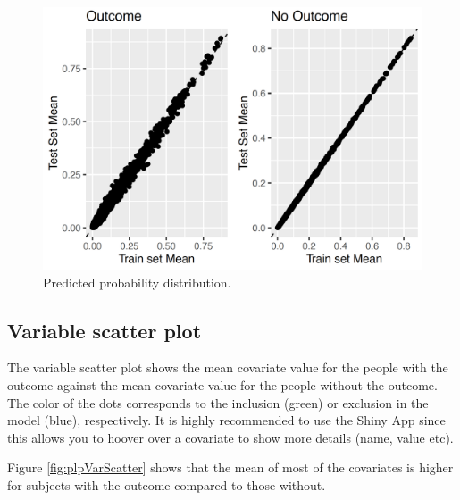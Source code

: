 \documentclass[11pt]{book}
\begin{document}
\begin{figure}

{\centering \includegraphics[width=1\linewidth]{images/PatientLevelPrediction/generalizability} 

}

\caption{Predicted probability distribution.}\label{fig:plpTestTrain}
\end{figure}

\subsection{Variable scatter plot}\label{variable-scatter-plot}

The variable scatter plot shows the mean covariate value for the people
with the outcome against the mean covariate value for the people without
the outcome. The color of the dots corresponds to the inclusion (green)
or exclusion in the model (blue), respectively. It is highly recommended
to use the Shiny App since this allows you to hoover over a covariate to
show more details (name, value etc).

Figure \ref{fig:plpVarScatter} shows that the mean of most of the
covariates is higher for subjects with the outcome compared to those
without.
\end{document}
